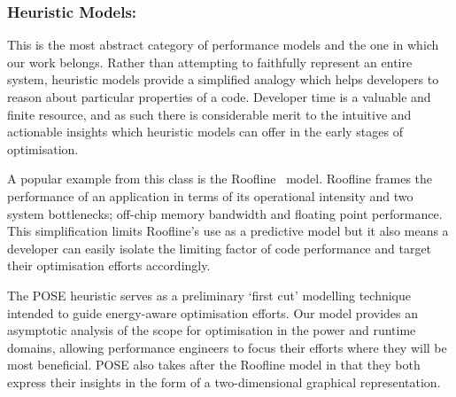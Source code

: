\subsubsection{Heuristic Models:}
This is the most abstract category of performance models and the one in which our work belongs.
Rather than attempting to faithfully represent an entire system, heuristic models provide a simplified analogy which helps developers to reason about particular properties of a code.
Developer time is a valuable and finite resource, and as such there is considerable merit to the intuitive and actionable insights which heuristic models can offer in the early stages of optimisation.

A popular example from this class is the Roofline~\cite{williams:2009aa} model.
Roofline frames the performance of an application in terms of its operational intensity and two system bottlenecks; off-chip memory bandwidth and floating point performance.
This simplification limits Roofline's use as a predictive model but it also means a developer can easily isolate the limiting factor of code performance and target their optimisation efforts accordingly.

The POSE heuristic serves as a preliminary `first cut' modelling technique intended to guide energy-aware optimisation efforts.
Our model provides an asymptotic analysis of the scope for optimisation in the power and runtime domains, allowing performance engineers to focus their efforts where they will be most beneficial.
POSE also takes after the Roofline model in that they both express their insights in the form of a two-dimensional graphical representation.
